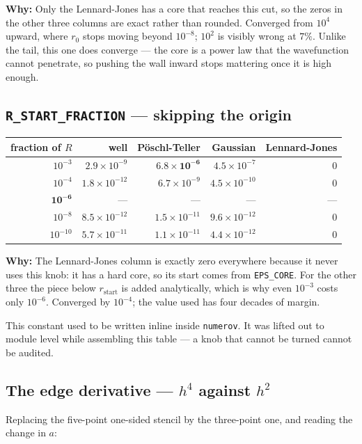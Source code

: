 \documentclass[11pt,a4paper]{article}
\newcommand{\why}[1]{\medskip\noindent\textbf{Why:} #1\medskip}
\begin{document}
\why{Only the Lennard-Jones has a core that reaches this cut, so the zeros in
the other three columns are exact rather than rounded. Converged from $10^4$
upward, where $r_0$ stops moving beyond $10^{-8}$; $10^{2}$ is visibly wrong at
$7\%$. Unlike the tail, this one does converge --- the core is a power law that
the wavefunction cannot penetrate, so pushing the wall inward stops mattering
once it is high enough.}

\subsection*{\texttt{R\_START\_FRACTION} --- skipping the origin}

\begin{center}\small
\begin{tabular}{rrrrr}
\toprule
fraction of $R$ & well & Pöschl-Teller & Gaussian & Lennard-Jones \\
\midrule
$10^{-3}$ & $2.9\times10^{-9}$ & $\mathbf{6.8\times10^{-6}}$ & $4.5\times10^{-7}$ & $0$ \\
$10^{-4}$ & $1.8\times10^{-12}$ & $6.7\times10^{-9}$ & $4.5\times10^{-10}$ & $0$ \\
$\mathbf{10^{-6}}$ & --- & --- & --- & --- \\
$10^{-8}$ & $8.5\times10^{-12}$ & $1.5\times10^{-11}$ & $9.6\times10^{-12}$ & $0$ \\
$10^{-10}$ & $5.7\times10^{-11}$ & $1.1\times10^{-11}$ & $4.4\times10^{-12}$ & $0$ \\
\bottomrule
\end{tabular}
\end{center}

\why{The Lennard-Jones column is exactly zero everywhere because it never uses
this knob: it has a hard core, so its start comes from \texttt{EPS\_CORE}. For the
other three the piece below $r_{\text{start}}$ is added analytically, which is
why even $10^{-3}$ costs only $10^{-6}$. Converged by $10^{-4}$; the value used
has four decades of margin.

This constant used to be written inline inside \texttt{numerov}. It was lifted
out to module level while assembling this table --- a knob that cannot be turned
cannot be audited.}

\subsection*{The edge derivative --- $h^4$ against $h^2$}

Replacing the five-point one-sided stencil by the three-point one, and reading
the change in $a$:
\end{document}

